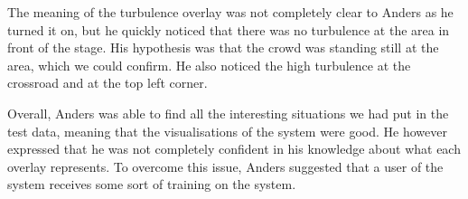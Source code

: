 The meaning of the turbulence overlay was not completely clear to Anders as he turned it on, but he quickly noticed that there was no turbulence at the area in front of the stage. His hypothesis was that the crowd was standing still at the area, which we could confirm. He also noticed the high turbulence at the crossroad and at the top left corner.

Overall, Anders was able to find all the interesting situations we had put in the test data, meaning that the visualisations of the system were good. He however expressed that he was not completely confident in his knowledge about what each overlay represents. To overcome this issue, Anders suggested that a user of the system receives some sort of training on the system.







